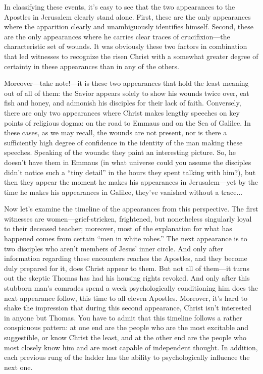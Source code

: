In classifying these events, it's easy to see that the two appearances to the Apostles in Jerusalem clearly stand alone. First, these are the only appearances where the apparition clearly and unambiguously identifies himself. Second, these are the only appearances where he carries clear traces of crucifixion---the characteristic set of wounds. It was obviously these two factors in combination that led witnesses to recognize the risen Christ with a somewhat greater degree of certainty in these appearances than in any of the others.

Moreover---take note!---it is these two appearances that hold the least meaning out of all of them: the Savior appears solely to show his wounds twice over, eat fish and honey, and admonish his disciples for their lack of faith. Conversely, there are only two appearances where Christ makes lengthy speeches on key points of religious dogma: on the road to Emmaus and on the Sea of Galilee. In these cases, as we may recall, the wounds are not present, nor is there a sufficiently high degree of confidence in the identity of the man making these speeches. Speaking of the wounds: they paint an interesting picture. So, he doesn't have them in Emmaus (in what universe could you assume the disciples didn't notice such a ``tiny detail'' in the hours they spent talking with him?), but then they appear the moment he makes his appearances in Jerusalem---yet by the time he makes his appearances in Galilee, they've vanished without a trace...

Now let's examine the timeline of the appearances from this perspective. The first witnesses are women---grief-stricken, frightened, but nonetheless singularly loyal to their deceased teacher; moreover, most of the explanation for what has happened comes from certain ``men in white robes.'' The next appearance is to two disciples who aren't members of Jesus' inner circle. And only after information regarding these encounters reaches the Apostles, and they become duly prepared for it, does Christ appear to them. But not all of them---it turns out the skeptic Thomas has had his housing rights revoked. And only after this stubborn man's comrades spend a week psychologically conditioning him does the next appearance follow, this time to all eleven Apostles. Moreover, it's hard to shake the impression that during this second appearance, Christ isn't interested in anyone but Thomas. You have to admit that this timeline follows a rather conspicuous pattern: at one end are the people who are the most excitable and suggestible, or know Christ the least, and at the other end are the people who most closely know him and are most capable of independent thought. In addition, each previous rung of the ladder has the ability to psychologically influence the next one.

